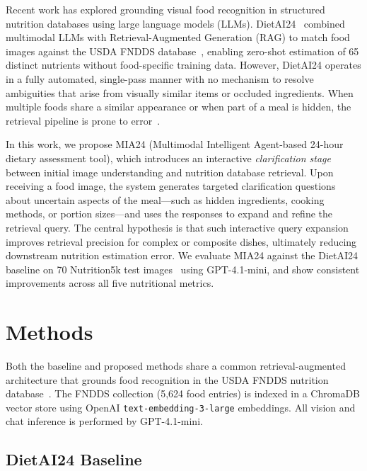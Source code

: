 \documentclass[11pt]{article}
\begin{document}
Recent work has explored grounding visual food recognition in structured nutrition databases using large language models (LLMs).
DietAI24~\citep{yan2025dietai24} combined multimodal LLMs with Retrieval-Augmented Generation (RAG) to match food images against the USDA FNDDS database~\citep{rhodes2023fndds}, enabling zero-shot estimation of 65 distinct nutrients without food-specific training data.
However, DietAI24 operates in a fully automated, single-pass manner with no mechanism to resolve ambiguities that arise from visually similar items or occluded ingredients.
When multiple foods share a similar appearance or when part of a meal is hidden, the retrieval pipeline is prone to error~\citep{dalakleidi2022applying,lo2020image}.

In this work, we propose MIA24 (Multimodal Intelligent Agent-based 24-hour dietary assessment tool), which introduces an interactive \emph{clarification stage} between initial image understanding and nutrition database retrieval.
Upon receiving a food image, the system generates targeted clarification questions about uncertain aspects of the meal---such as hidden ingredients, cooking methods, or portion sizes---and uses the responses to expand and refine the retrieval query.
The central hypothesis is that such interactive query expansion improves retrieval precision for complex or composite dishes, ultimately reducing downstream nutrition estimation error.
We evaluate MIA24 against the DietAI24 baseline on 70 Nutrition5k test images~\citep{thames2021nutrition5k} using GPT-4.1-mini, and show consistent improvements across all five nutritional metrics.

\section{Methods}
\label{sec:methods}

Both the baseline and proposed methods share a common retrieval-augmented architecture that grounds food recognition in the USDA FNDDS nutrition database~\citep{bodner2006fndds,ahuja2013usda,rhodes2023fndds}.
The FNDDS collection (5,624 food entries) is indexed in a ChromaDB vector store using OpenAI \texttt{text-embedding-3-large} embeddings.
All vision and chat inference is performed by GPT-4.1-mini.

\subsection{DietAI24 Baseline}
\label{sec:baseline}
\end{document}
